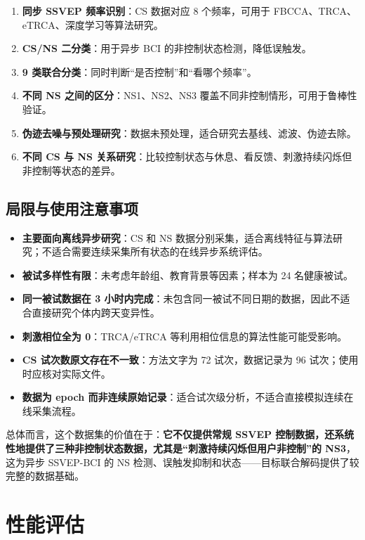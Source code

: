 \documentclass[12pt, a4paper]{ctexart}
\begin{document}
\begin{enumerate}
  \item \textbf{同步 SSVEP 频率识别}：CS 数据对应 8 个频率，可用于 FBCCA、TRCA、eTRCA、深度学习等算法研究。
  \item \textbf{CS/NS 二分类}：用于异步 BCI 的非控制状态检测，降低误触发。
  \item \textbf{9 类联合分类}：同时判断``是否控制''和``看哪个频率''。
  \item \textbf{不同 NS 之间的区分}：NS1、NS2、NS3 覆盖不同非控制情形，可用于鲁棒性验证。
  \item \textbf{伪迹去噪与预处理研究}：数据未预处理，适合研究去基线、滤波、伪迹去除。
  \item \textbf{不同 CS 与 NS 关系研究}：比较控制状态与休息、看反馈、刺激持续闪烁但非控制等状态的差异。
\end{enumerate}

\subsection{局限与使用注意事项}

\begin{itemize}
  \item \textbf{主要面向离线异步研究}：CS 和 NS 数据分别采集，适合离线特征与算法研究；不适合需要连续采集所有状态的在线异步系统评估。
  \item \textbf{被试多样性有限}：未考虑年龄组、教育背景等因素；样本为 24 名健康被试。
  \item \textbf{同一被试数据在 3 小时内完成}：未包含同一被试不同日期的数据，因此不适合直接研究个体内跨天变异性。
  \item \textbf{刺激相位全为 0}：TRCA/eTRCA 等利用相位信息的算法性能可能受影响。
  \item \textbf{CS 试次数原文存在不一致}：方法文字为 72 试次，数据记录为 96 试次；使用时应核对实际文件。
  \item \textbf{数据为 epoch 而非连续原始记录}：适合试次级分析，不适合直接模拟连续在线采集流程。
\end{itemize}

总体而言，这个数据集的价值在于：\textbf{它不仅提供常规 SSVEP 控制数据，还系统性地提供了三种非控制状态数据，尤其是``刺激持续闪烁但用户非控制''的 NS3}，这为异步 SSVEP-BCI 的 NS 检测、误触发抑制和状态——目标联合解码提供了较完整的数据基础。

\section{性能评估}
\end{document}
